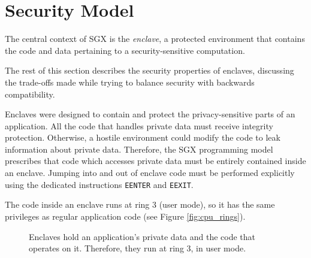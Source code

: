 \section{Security Model}
\label{sec:attestation}

The central context of SGX is the \textit{enclave}, a protected environment
that contains the code and data pertaining to a security-sensitive computation.

The rest of this section describes the security properties of
enclaves, discussing the trade-offs made while trying to balance security with
backwards compatibility.

Enclaves were designed to contain and protect the privacy-sensitive parts of an
application. All the code that handles private data must receive integrity
protection. Otherwise, a hostile environment could modify the code to leak
information about private data. Therefore, the SGX programming model prescribes
that code which accesses private data must be entirely contained inside an
enclave. Jumping into and out of enclave code must be performed explicitly
using the dedicated instructions \texttt{EENTER} and \texttt{EEXIT}.

The code inside an enclave runs at ring 3 (user mode), so it has the same
privileges as regular application code (see Figure \ref{fig:cpu_rings}).

\begin{figure}[hbtp]
  \caption{
    Enclaves hold an application's private data and the code that operates on
    it. Therefore, they run at ring 3, in user mode.
  }
  \label{fig:computing_model}
\end{figure}
